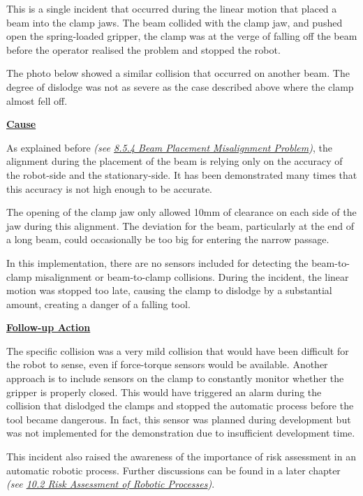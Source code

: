 This is a single incident that occurred during the linear motion that placed a beam into the clamp jaws. The beam collided with the clamp jaw, and pushed open the spring-loaded gripper, the clamp was at the verge of falling off the beam before the operator realised the problem and stopped the robot.

The photo below showed a similar collision that occurred on another beam. The degree of dislodge was not as severe as the case described above where the clamp almost fell off.




\textbf{\ul{Cause}}

As explained before \textit{(see \ul{8.5.4 Beam Placement Misalignment Problem})}, the alignment during the placement of the beam is relying only on the accuracy of the robot-side and the stationary-side. It has been demonstrated many times that this accuracy is not high enough to be accurate. 

The opening of the clamp jaw only allowed 10mm of clearance on each side of the jaw during this alignment. The deviation for the beam, particularly at the end of a long beam, could occasionally be too big for entering the narrow passage.

In this implementation, there are no sensors included for detecting the beam-to-clamp misalignment or beam-to-clamp collisions. During the incident, the linear motion was stopped too late, causing the clamp to dislodge by a substantial amount, creating a danger of a falling tool.

\textbf{\ul{Follow-up Action}}

The specific collision was a very mild collision that would have been difficult for the robot to sense, even if force-torque sensors would be available. Another approach is to include sensors on the clamp to constantly monitor whether the gripper is properly closed. This would have triggered an alarm during the collision that dislodged the clamps and stopped the automatic process before the tool became dangerous. In fact, this sensor was planned during development but was not implemented for the demonstration due to insufficient development time. 

This incident also raised the awareness of the importance of risk assessment in an automatic robotic process. Further discussions can be found in a later chapter \textit{(see \ul{10.2 Risk Assessment of Robotic Processes})}.
